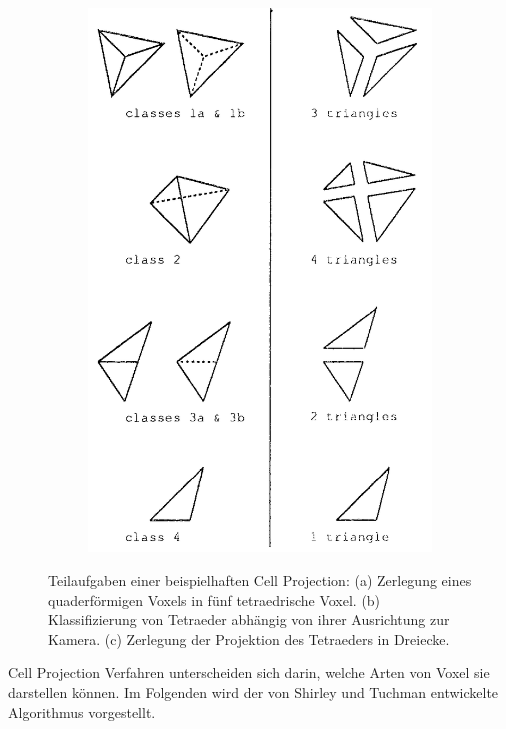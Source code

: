 \documentclass[a4paper,fontsize=12pt,toc=bib,parskip=half,ngerman]{scrartcl}
\begin{document}
\begin{figure}
\begin{subfigure}{0.3\textwidth}
		\subcaption{}
		\label{Classes}
	\end{subfigure}
	\begin{subfigure}{0.3\textwidth}
		\centering
		\includegraphics[width=\textwidth]{pictures/Triangle.png}
		\subcaption{}
		\label{Triangle}
	\end{subfigure}
	\caption{Teilaufgaben einer beispielhaften Cell Projection: (a) Zerlegung eines quaderf\"ormigen Voxels in f\"unf tetraedrische Voxel. (b) Klassifizierung von Tetraeder abh\"angig von ihrer Ausrichtung zur Kamera. (c) Zerlegung der Projektion des Tetraeders in Dreiecke.}
\end{figure}

Cell Projection Verfahren unterscheiden sich darin, welche Arten von Voxel sie darstellen k\"onnen. Im Folgenden wird der von Shirley und Tuchman \cite{shirley1990polygonal} entwickelte Algorithmus vorgestellt.
\end{document}
